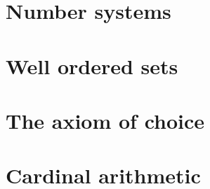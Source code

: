 \documentclass{article}
\begin{document}
\begin{multicols}{2}
    
    
    
    \noindent\section{Number systems}
    
    
    
    
    
    \noindent\section{Well ordered sets}
    
    
    
    
    \noindent\section{The axiom of choice}
    
    
    
    
    \noindent\section{Cardinal arithmetic}
    
    
    
    
  \end{multicols}
\end{document}
